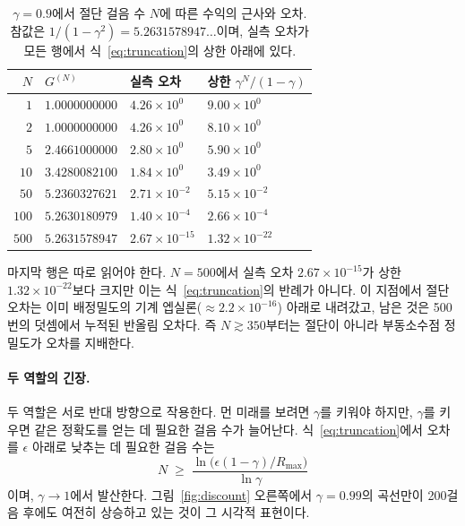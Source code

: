 \documentclass[11pt,a4paper]{article}
\begin{document}
\begin{table}[htbp]
\centering
\caption{$\gamma=0.9$에서 절단 걸음 수 $N$에 따른 수익의 근사와 오차. 참값은
$1/(1-\gamma^2)=5.2631578947\ldots$이며, 실측 오차가 모든 행에서 식~\eqref{eq:truncation}의 상한
아래에 있다.}
\label{tab:truncation}
\small
\begin{tabular}{@{}rlll@{}}
\toprule
$N$ & $G^{(N)}$ & 실측 오차 & 상한 $\gamma^N/(1-\gamma)$ \\
\midrule
$1$   & $1.0000000000$ & $4.26\times10^{0}$   & $9.00\times10^{0}$   \\
$2$   & $1.0000000000$ & $4.26\times10^{0}$   & $8.10\times10^{0}$   \\
$5$   & $2.4661000000$ & $2.80\times10^{0}$   & $5.90\times10^{0}$   \\
$10$  & $3.4280082100$ & $1.84\times10^{0}$   & $3.49\times10^{0}$   \\
$50$  & $5.2360327621$ & $2.71\times10^{-2}$  & $5.15\times10^{-2}$  \\
$100$ & $5.2630180979$ & $1.40\times10^{-4}$  & $2.66\times10^{-4}$  \\
$500$ & $5.2631578947$ & $2.67\times10^{-15}$ & $1.32\times10^{-22}$ \\
\bottomrule
\end{tabular}
\end{table}

마지막 행은 따로 읽어야 한다. $N=500$에서 실측 오차 $2.67\times10^{-15}$가 상한
$1.32\times10^{-22}$보다 크지만 이는 식~\eqref{eq:truncation}의 반례가 아니다. 이 지점에서 절단 오차는
이미 배정밀도의 기계 엡실론($\approx 2.2\times10^{-16}$) 아래로 내려갔고, 남은 것은 500번의 덧셈에서
누적된 반올림 오차다. 즉 $N\gtrsim 350$부터는 절단이 아니라 부동소수점 정밀도가 오차를 지배한다.

\paragraph{두 역할의 긴장.}
두 역할은 서로 반대 방향으로 작용한다. 먼 미래를 보려면 $\gamma$를 키워야 하지만, $\gamma$를 키우면
같은 정확도를 얻는 데 필요한 걸음 수가 늘어난다. 식~\eqref{eq:truncation}에서 오차를 $\epsilon$ 아래로
낮추는 데 필요한 걸음 수는
\begin{equation}
  N \;\ge\; \frac{\ln\bigl(\epsilon(1-\gamma)/R_{\max}\bigr)}{\ln\gamma}
\end{equation}
이며, $\gamma\to1$에서 발산한다. 그림~\ref{fig:discount} 오른쪽에서 $\gamma=0.99$의 곡선만이 200걸음
후에도 여전히 상승하고 있는 것이 그 시각적 표현이다.
\end{document}
